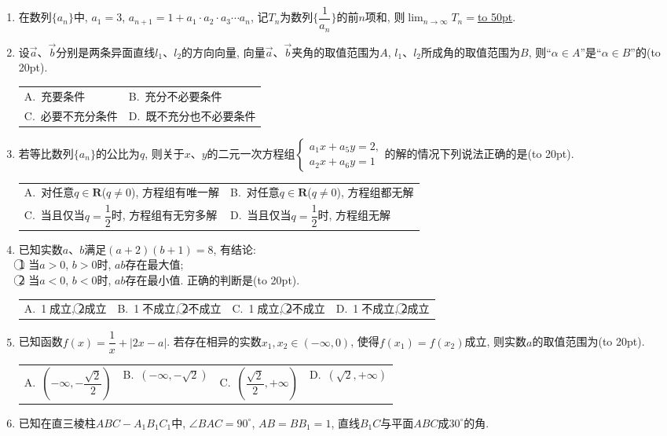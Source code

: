 \documentclass[10pt,a4paper]{article}
\newcommand{\blank}[1]{\underline{\hbox to #1pt{}}}
\newcommand{\bracket}[1]{(\hbox to #1pt{})}
\newcommand{\twoch}[4]{\par\begin{tabular}{p{.46\textwidth}p{.46\textwidth}}
A.~#1& B.~#2\\
C.~#3& D.~#4
\end{tabular}}
\newcommand{\fourch}[4]{\par\begin{tabular}{p{.23\textwidth}p{.23\textwidth}p{.23\textwidth}p{.23\textwidth}}
A.~#1 &B.~#2& C.~#3& D.~#4
\end{tabular}}
\begin{document}
\begin{enumerate}[1.]
\item 在数列$\{a_n\}$中, $a_1=3$, $a_{n+1}=1+a_1\cdot a_2\cdot a_3\cdots a_n$, 记$T_n$为数列$\{\dfrac 1{a_n}\}$的前$n$项和, 则$\displaystyle\lim_{n\to\infty} T_n=$\blank{50}.
\item 设$\overrightarrow a$、$\overrightarrow b$分别是两条异面直线$l_1$、$l_2$的方向向量, 向量$\overrightarrow a$、$\overrightarrow b$夹角的取值范围为$A$, $l_1$、$l_2$所成角的取值范围为$B$, 则``$\alpha \in A$''是``$\alpha \in B$''的\bracket{20}.
\twoch{充要条件}{充分不必要条件}{必要不充分条件}{既不充分也不必要条件}
\item 若等比数列$\{a_n\}$的公比为$q$, 则关于$x$、$y$的二元一次方程组$\begin{cases} a_1x+a_5y=2, \\ a_2x+a_6y=1 \end{cases}$的解的情况下列说法正确的是\bracket{20}.
\twoch{对任意$q\in \mathbf{R}$($q\ne 0$), 方程组有唯一解}{对任意$q\in \mathbf{R}$($q\ne 0$), 方程组都无解}{当且仅当$q=\dfrac 12$时, 方程组有无穷多解}{当且仅当$q=\dfrac 12$时, 方程组无解}
\item 已知实数$a$、$b$满足$(a+2)(b+1)=8$, 有结论:\\
\textcircled{1} 当$a>0$, $b>0$时, $ab$存在最大值;\\
\textcircled{2} 当$a<0$, $b<0$时, $ab$存在最小值. 正确的判断是\bracket{20}.
\fourch{\textcircled{1}成立, \textcircled{2}成立}{\textcircled{1}不成立, \textcircled{2}不成立}{\textcircled{1}成立, \textcircled{2}不成立}{\textcircled{1}不成立, \textcircled{2}成立}
\item 已知函数$f(x)=\dfrac 1x+|2x-a|$. 若存在相异的实数$x_1,x_2\in (-\infty ,0)$, 使得$f(x_1)=f(x_2)$成立, 则实数$a$的取值范围为\bracket{20}.
\fourch{$(-\infty,-\dfrac{\sqrt{2}}2)$}{$(-\infty,-\sqrt{2})$}{$(\dfrac{\sqrt{2}}2,+\infty)$}{$(\sqrt 2,+\infty)$}
\item 已知在直三棱柱$ABC-A_1B_1C_1$中, $\angle BAC=90^\circ$, $AB=BB_1=1$, 直线$B_1C$与平面$ABC$成$30^\circ$的角.
\begin{center}
\end{center}
\end{enumerate}
\end{document}
